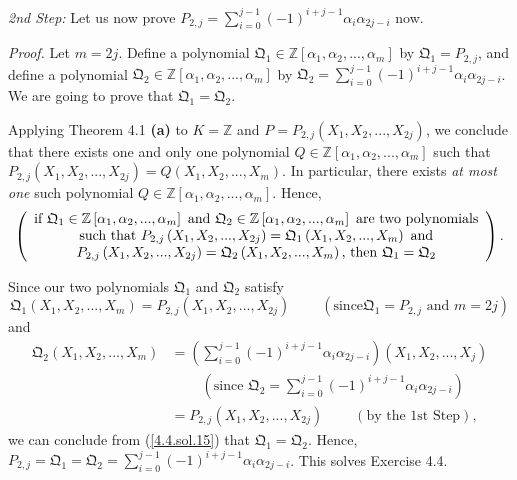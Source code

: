 \documentclass[numbers=enddot,12pt,final,onecolumn,notitlepage]{scrartcl}%
\begin{document}
\textit{2nd Step:} Let us now prove $P_{2,j}=\sum\limits_{i=0}^{j-1}\left(
-1\right)  ^{i+j-1}\alpha_{i}\alpha_{2j-i}$ now.

\textit{Proof.} Let $m=2j$. Define a polynomial $\mathfrak{Q}_{1}\in
\mathbb{Z}\left[  \alpha_{1},\alpha_{2},...,\alpha_{m}\right]  $ by
$\mathfrak{Q}_{1}=P_{2,j}$, and define a polynomial $\mathfrak{Q}_{2}%
\in\mathbb{Z}\left[  \alpha_{1},\alpha_{2},...,\alpha_{m}\right]  $ by
$\mathfrak{Q}_{2}=\sum\limits_{i=0}^{j-1}\left(  -1\right)  ^{i+j-1}\alpha
_{i}\alpha_{2j-i}$. We are going to prove that $\mathfrak{Q}_{1}%
=\mathfrak{Q}_{2}$.

Applying Theorem 4.1 \textbf{(a)} to $K=\mathbb{Z}$ and $P=P_{2,j}\left(
X_{1},X_{2},...,X_{2j}\right)  $, we conclude that there exists one and only
one polynomial $Q\in\mathbb{Z}\left[  \alpha_{1},\alpha_{2},...,\alpha
_{m}\right]  $ such that $P_{2,j}\left(  X_{1},X_{2},...,X_{2j}\right)
=Q\left(  X_{1},X_{2},...,X_{m}\right)  $. In particular, there exists
\textit{at most one} such polynomial $Q\in\mathbb{Z}\left[  \alpha_{1}%
,\alpha_{2},...,\alpha_{m}\right]  $. Hence,
\begin{equation}
\left(
\begin{array}
[c]{c}%
\text{if }\mathfrak{Q}_{1}\in\mathbb{Z}\left[  \alpha_{1},\alpha
_{2},...,\alpha_{m}\right]  \text{ and }\mathfrak{Q}_{2}\in\mathbb{Z}\left[
\alpha_{1},\alpha_{2},...,\alpha_{m}\right]  \text{ are two polynomials}\\
\text{such that }P_{2,j}\left(  X_{1},X_{2},...,X_{2j}\right)  =\mathfrak{Q}%
_{1}\left(  X_{1},X_{2},...,X_{m}\right)  \text{ and}\\
P_{2,j}\left(  X_{1},X_{2},...,X_{2j}\right)  =\mathfrak{Q}_{2}\left(
X_{1},X_{2},...,X_{m}\right)  \text{, then }\mathfrak{Q}_{1}=\mathfrak{Q}_{2}%
\end{array}
\right)  . \label{4.4.sol.15}%
\end{equation}


Since our two polynomials $\mathfrak{Q}_{1}$ and $\mathfrak{Q}_{2}$ satisfy%
\[
\mathfrak{Q}_{1}\left(  X_{1},X_{2},...,X_{m}\right)  =P_{2,j}\left(
X_{1},X_{2},...,X_{2j}\right)  \ \ \ \ \ \ \ \ \ \ \left(  \text{since
}\mathfrak{Q}_{1}=P_{2,j}\text{ and }m=2j\right)
\]
and%
\begin{align*}
\mathfrak{Q}_{2}\left(  X_{1},X_{2},...,X_{m}\right)   &  =\left(
\sum\limits_{i=0}^{j-1}\left(  -1\right)  ^{i+j-1}\alpha_{i}\alpha
_{2j-i}\right)  \left(  X_{1},X_{2},...,X_{j}\right) \\
&  \ \ \ \ \ \ \ \ \ \ \left(  \text{since }\mathfrak{Q}_{2}=\sum
\limits_{i=0}^{j-1}\left(  -1\right)  ^{i+j-1}\alpha_{i}\alpha_{2j-i}\right)
\\
&  =P_{2,j}\left(  X_{1},X_{2},...,X_{2j}\right)  \ \ \ \ \ \ \ \ \ \ \left(
\text{by the 1st Step}\right)  ,
\end{align*}
we can conclude from (\ref{4.4.sol.15}) that $\mathfrak{Q}_{1}=\mathfrak{Q}%
_{2}$. Hence, $P_{2,j}=\mathfrak{Q}_{1}=\mathfrak{Q}_{2}=\sum\limits_{i=0}%
^{j-1}\left(  -1\right)  ^{i+j-1}\alpha_{i}\alpha_{2j-i}$. This solves
Exercise 4.4.
\end{document}
